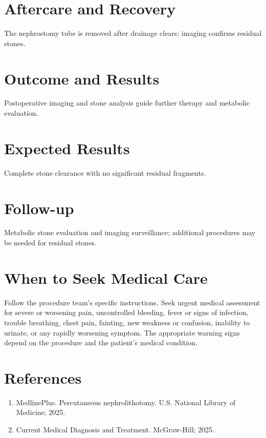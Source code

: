 \section*{Aftercare and Recovery}
The nephrostomy tube is removed after drainage clears; imaging confirms residual stones.

\section*{Outcome and Results}
Postoperative imaging and stone analysis guide further therapy and metabolic evaluation.

\section*{Expected Results}
Complete stone clearance with no significant residual fragments.

\section*{Follow-up}
Metabolic stone evaluation and imaging surveillance; additional procedures may be needed for residual stones.

\section*{When to Seek Medical Care}
Follow the procedure team's specific instructions. Seek urgent medical assessment for severe or worsening pain, uncontrolled bleeding, fever or signs of infection, trouble breathing, chest pain, fainting, new weakness or confusion, inability to urinate, or any rapidly worsening symptom. The appropriate warning signs depend on the procedure and the patient's medical condition.

\section*{References}
\begin{enumerate}
  \item MedlinePlus. Percutaneous nephrolithotomy. U.S. National Library of Medicine; 2025.
  \item Current Medical Diagnosis and Treatment. McGraw-Hill; 2025.
\end{enumerate}

\clearpage
